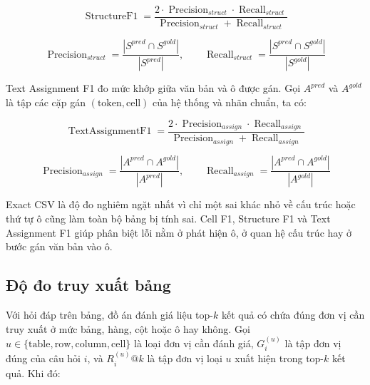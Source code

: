 \documentclass[../DoAn.tex]{subfiles}
\begin{document}
\begin{equation}
\label{eq:structure-f1}
\operatorname{StructureF1} =
\frac{2 \cdot \operatorname{Precision}_{struct} \cdot \operatorname{Recall}_{struct}}
{\operatorname{Precision}_{struct}+\operatorname{Recall}_{struct}}
\end{equation}

\begin{equation}
\label{eq:structure-precision-recall}
\operatorname{Precision}_{struct} =
\frac{|S^{pred} \cap S^{gold}|}{|S^{pred}|},
\qquad
\operatorname{Recall}_{struct} =
\frac{|S^{pred} \cap S^{gold}|}{|S^{gold}|}
\end{equation}

Text Assignment F1 đo mức khớp giữa văn bản và ô được gán. Gọi \(A^{pred}\) và
\(A^{gold}\) là tập các cặp gán \((\text{token}, \text{cell})\) của hệ thống và
nhãn chuẩn, ta có:

\begin{equation}
\label{eq:text-assignment-f1}
\operatorname{TextAssignmentF1} =
\frac{2 \cdot \operatorname{Precision}_{assign} \cdot \operatorname{Recall}_{assign}}
{\operatorname{Precision}_{assign}+\operatorname{Recall}_{assign}}
\end{equation}

\begin{equation}
\label{eq:text-assignment-precision-recall}
\operatorname{Precision}_{assign} =
\frac{|A^{pred} \cap A^{gold}|}{|A^{pred}|},
\qquad
\operatorname{Recall}_{assign} =
\frac{|A^{pred} \cap A^{gold}|}{|A^{gold}|}
\end{equation}

Exact CSV là độ đo nghiêm ngặt nhất vì chỉ một sai khác nhỏ về cấu trúc hoặc thứ
tự ô cũng làm toàn bộ bảng bị tính sai. Cell F1, Structure F1 và
Text Assignment F1 giúp phân biệt lỗi nằm ở phát hiện ô, ở quan hệ cấu trúc hay
ở bước gán văn bản vào ô.

\subsection{Độ đo truy xuất bảng}

Với hỏi đáp trên bảng, đồ án đánh giá liệu top-\(k\) kết quả có chứa đúng đơn vị cần truy
xuất ở mức bảng, hàng, cột hoặc ô hay không. Gọi \(u \in
\{\text{table},\text{row},\text{column},\text{cell}\}\) là loại đơn vị cần đánh
giá, \(G_i^{(u)}\) là tập đơn vị đúng của câu hỏi \(i\), và \(R_i^{(u)}@k\) là tập
đơn vị loại \(u\) xuất hiện trong top-\(k\) kết quả. Khi đó:
\end{document}
